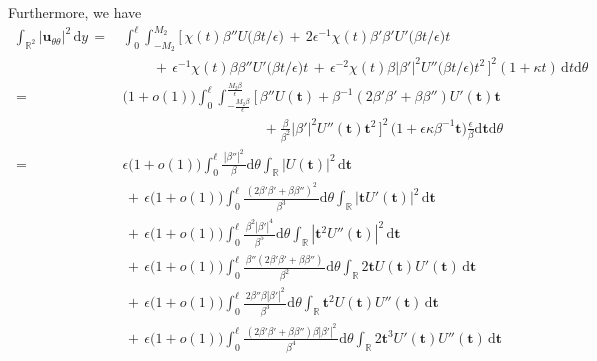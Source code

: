 \documentclass[10pt, reqno]{amsart}
\numberwithin{equation}{section}
\theoremstyle{definition}
\begin{document}
{{\medskip
 Furthermore, we have
\begin{align}
 \int_{{\mathbb R}^2} |{\mathbf u}_{\theta\theta}|^2 \,{\mathrm d} y
 \,=\, &
 \int_0^{\ell} \int_{-M_2}^{M_2}
 \Big[\,
 \chi(t)\beta''U\big(\beta t/\epsilon\big)
 \,+\, 2 \epsilon^{-1}\chi(t)\beta'\beta' U'\big(\beta t/\epsilon\big)t
\nonumber\\[2mm]
 &\qquad
 \,+\, \epsilon^{-1}\chi(t)\beta\beta'' U'\big(\beta t/\epsilon\big)t
 \,+\, \epsilon^{-2}\chi(t)\beta|\beta'|^2 U''\big(\beta t/\epsilon\big)t^2
 \, \Big]^2 (1+\kappa t )\,{\mathrm d}t{\mathrm d}\theta
\nonumber\\[2mm]
 \,=\,& \big(1+o(1)\big)
 \int_0^{\ell} \int_{-\frac{M_2\beta}{\epsilon}}^{\frac{M_2\beta}{\epsilon}}
 \Big[\,\beta''U({\mathbf t})+\beta^{-1}(2\beta'\beta'+\beta\beta'')U'({\mathbf t}){\mathbf t}
\nonumber\\[2mm]
 &\qquad\qquad\qquad\qquad\qquad+\frac{\beta}{\beta^2} |\beta'|^2 U''({\mathbf t}){\mathbf t}^2\,\Big]^2
 \,\big(1+\epsilon\kappa\beta^{-1}{\mathbf t}\big)\frac{\epsilon}{\beta}{\mathrm d}{\mathbf t}{\mathrm d}\theta
\nonumber\\[2mm]
 \,=\, &\epsilon \big(1+o(1)\big)\int_0^{\ell}
 \frac{\, |\beta''|^2\, }{\beta} {\mathrm d}\theta\int_{\mathbb R} |U({\mathbf t})|^2 \,{\mathrm d}{\mathbf t}
\nonumber\\[2mm]
 &\,+\,
 \epsilon \big(1+o(1)\big)\int_0^{\ell}
 \frac{\, (2\beta'\beta'+\beta\beta'')^2\, }{\beta^3} {\mathrm d}\theta
 \int_{\mathbb R} |{\mathbf t}U'({\mathbf t})|^2 \,{\mathrm d}{\mathbf t}
\nonumber\\[2mm]
 &\,+\,
 \epsilon \big(1+o(1)\big)\int_0^{\ell}
 \frac{\, \beta^2|\beta'|^4\, }{\beta^5} {\mathrm d}\theta
 \int_{\mathbb R} |{\mathbf t}^2U''({\mathbf t})|^2 \,{\mathrm d}{\mathbf t}
\nonumber\\[2mm]
 &\,+\,
 \epsilon \big(1+o(1)\big)\int_0^{\ell}
 \frac{\, \beta''(2\beta'\beta'+\beta\beta'')\, }{\beta^2} {\mathrm d}\theta
 \int_{\mathbb R} 2{\mathbf t}U({\mathbf t})U'({\mathbf t}) \,{\mathrm d}{\mathbf t}
\nonumber\\[2mm]
 &\,+\,
 \epsilon \big(1+o(1)\big)\int_0^{\ell}
 \frac{\, 2\beta''\beta|\beta'|^2\, }{\beta^3} {\mathrm d}\theta
 \int_{\mathbb R} {\mathbf t}^2U({\mathbf t})U''({\mathbf t}) \,{\mathrm d}{\mathbf t}
\nonumber\\[2mm]
 &\,+\,
 \epsilon \big(1+o(1)\big)\int_0^{\ell}
 \frac{\, (2\beta'\beta'+\beta\beta'')\beta|\beta'|^2\, }{\beta^4} {\mathrm d}\theta\int_{\mathbb R} 2{\mathbf t}^3U'({\mathbf t})U''({\mathbf t}) \,{\mathrm d}{\mathbf t}

\end{align}}}
\end{document}
